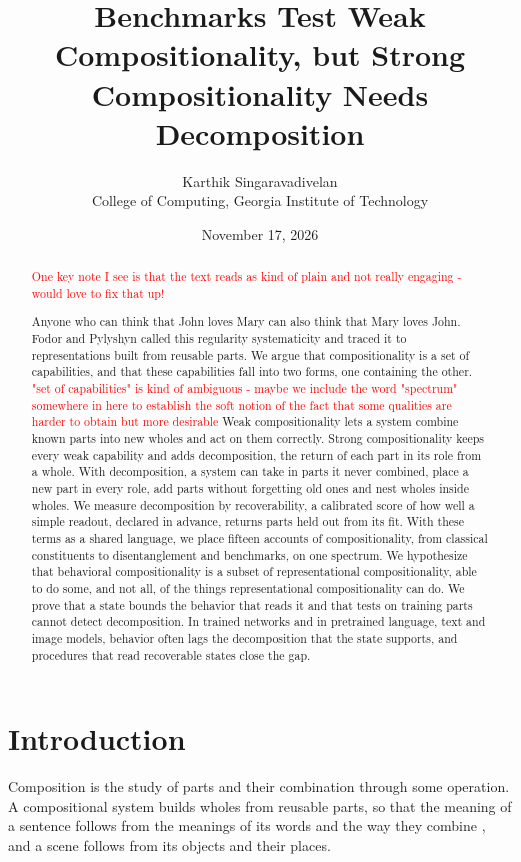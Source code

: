 \documentclass[10pt]{article}
\title{Benchmarks Test Weak Compositionality, but Strong Compositionality Needs Decomposition}
\author{Karthik Singaravadivelan\\ College of Computing, Georgia Institute of Technology}
\date{November 17, 2026}
\newcommand{\note}[1]{\textcolor{red}{#1}}
\theoremstyle{plain}
\theoremstyle{remark}
\begin{document}
\maketitle

\begin{abstract}
\note{One key note I see is that the text reads as kind of plain and not really engaging - would love to fix that up!}

Anyone who can think that John loves Mary can also think that Mary loves John. Fodor and Pylyshyn called this regularity systematicity and traced it to representations built from reusable parts. We argue that compositionality is a set of capabilities, and that these capabilities fall into two forms, one containing the other. \note{"set of capabilities" is kind of ambiguous - maybe we include the word "spectrum" somewhere in here to establish the soft notion of the fact that some qualities are harder to obtain but more desirable} Weak compositionality lets a system combine known parts into new wholes and act on them correctly. Strong compositionality keeps every weak capability and adds decomposition, the return of each part in its role from a whole. With decomposition, a system can take in parts it never combined, place a new part in every role, add parts without forgetting old ones and nest wholes inside wholes. We measure decomposition by recoverability, a calibrated score of how well a simple readout, declared in advance, returns parts held out from its fit. With these terms as a shared language, we place fifteen accounts of compositionality, from classical constituents to disentanglement and benchmarks, on one spectrum. We hypothesize that behavioral compositionality is a subset of representational compositionality, able to do some, and not all, of the things representational compositionality can do. We prove that a state bounds the behavior that reads it and that tests on training parts cannot detect decomposition. In trained networks and in pretrained language, text and image models, behavior often lags the decomposition that the state supports, and procedures that read recoverable states close the gap.
\end{abstract}

\section{Introduction}
\label{sec:intro}

Composition is the study of parts and their combination through some operation. A compositional system builds wholes from reusable parts, so that the meaning of a sentence follows from the meanings of its words and the way they combine \citep{frege1923,janssen1997}, and a scene follows from its objects and their places.
\end{document}
